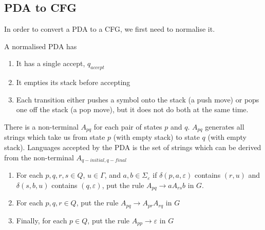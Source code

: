 \documentclass[a4paper]{article}
\theoremstyle{plain}
\theoremstyle{definition}
\newtheorem{defn}{Definition}[section]
\theoremstyle{remark}
\begin{document}
\subsection{PDA to CFG}
In order to convert a PDA to a CFG, we first need to normalise it.
\begin{tcolorbox}[colback=black!3!white,colframe=black!60!white,title=\begin{defn}Normalised PDA \label{Normalised PDA}\end{defn}]
A normalised PDA has
\begin{enumerate}
	\item It has a single accept, $q_{accept}$
	\item It empties its stack before accepting
	\item Each transition either pushes a symbol onto the stack (a push move) or pops one off the stack (a pop move), but it does not do both at the same time.
\end{enumerate}
\end{tcolorbox}
\begin{tcolorbox}[colback=black!3!white,colframe=black!60!white,title=\begin{defn}A \label{A}\end{defn}]
There is a non-terminal $A_{pq}$ for each pair of states $p$ and $q$. $A_{pq}$ generates all strings which take us from state $p$ (with empty stack) to state $q$ (with empty stack). Languages accepted by the PDA is the set of strings which can be derived from the non-terminal $A_{q-initial, q-final}$
\end{tcolorbox}
\begin{tcolorbox}[colback=black!3!white,colframe=black!60!white,title=\begin{defn}Three Rules \label{Three Rules}\end{defn}]
\begin{enumerate}
	\item For each $p,q,r,s \in Q$, $u \in \Gamma$, and $a,b \in \Sigma_{\varepsilon}$ if $\delta(p,a,\varepsilon)$ contains $(r,u)$ and $\delta(s,b,u)$ contains $(q,\varepsilon)$, put the rule $A_{pq} \to aA_{rs}b$ in $G$.
	\item For each $p,q,r \in Q$, put the rule $A_{pq} \to A_{pr}A_{rq}$ in $G$ 
	\item Finally, for each $p \in Q$, put the rule $A_{pp} \to \varepsilon$ in $G$
\end{enumerate}
\end{tcolorbox}
\end{document}
